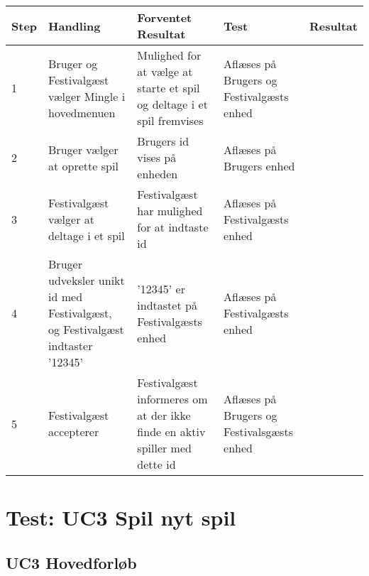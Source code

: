 \begin{longtable}{| p{0.7cm}  | p{3cm}  | p{4cm} |  p{3cm}  | p{3cm}  |}
\hline
Step & Handling & Forventet Resultat & Test & Resultat \\
\hline
1 &  Bruger og Festivalgæst vælger Mingle i hovedmenuen &  Mulighed for at vælge at starte et spil og deltage i et spil fremvises  & Aflæses på Brugers og Festivalgæsts enhed & \FuckingHuge{\checkmark} \\
\hline
2 &  Bruger vælger at oprette spil &  Brugers id vises på enheden  & Aflæses på Brugers enhed & \FuckingHuge{\checkmark} \\
\hline
3 &  Festivalgæst vælger at deltage i et spil &  Festivalgæst har mulighed for at indtaste id  & Aflæses på Festivalgæsts enhed & \FuckingHuge{\checkmark} \\
\hline
4 &  Bruger udveksler unikt id med Festivalgæst, og Festivalgæst indtaster '12345' &  '12345' er indtastet på Festivalgæsts enhed  & Aflæses på Festivalgæsts enhed & \FuckingHuge{\checkmark} \\
\hline
5 & Festivalgæst accepterer & Festivalgæst informeres om at der ikke finde en aktiv spiller med dette id & Aflæses på Brugers og Festivalsgæsts enhed & \FuckingHuge{\checkmark} \\ 
\hline
\end{longtable}


\newpage

\section{Test: UC3 Spil nyt spil}

\subsection{UC3 Hovedforløb}

